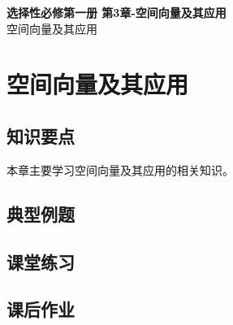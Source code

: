 \documentclass[12pt,a4paper]{article}
\begin{document}
\begin{center}
\LARGE\textbf{选择性必修第一册 第3章-空间向量及其应用} \\[0.5em]
\large 空间向量及其应用
\end{center}

\tableofcontents
\newpage

\section{空间向量及其应用}

\subsection{知识要点}
本章主要学习空间向量及其应用的相关知识。

\subsection{典型例题}

\subsection{课堂练习}

\subsection{课后作业}
\end{document}
